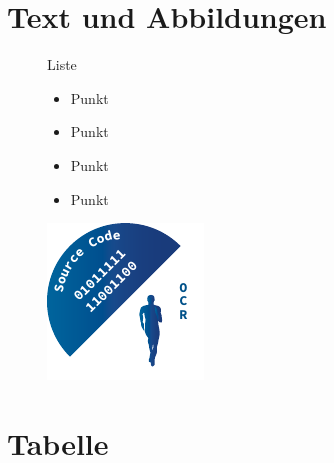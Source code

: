 \section*{Text und Abbildungen}%
	\begin{figure}[!h]%
		\centering
		\begin{minipage}[c]{0.55\textwidth}
			Liste
			\begin{itemize} 
				\item Punkt
				\item Punkt
				\item Punkt
				\item Punkt
			\end{itemize}
		\end{minipage}
		\hfill
		\begin{minipage}[c]{0.35\textwidth}
			\includegraphics[width=\textwidth]{images/Logo/Logo2}%
		\end{minipage}
	\end{figure}

\clearpage
\section*{Tabelle}%

